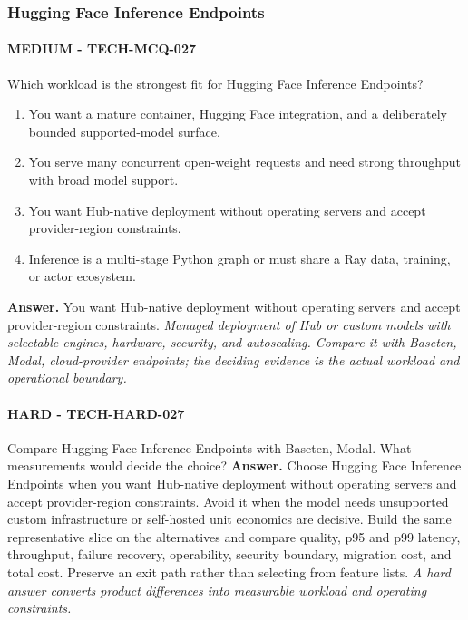 \subsubsection*{Hugging Face Inference Endpoints}
\paragraph{MEDIUM - TECH-MCQ-027} Which workload is the strongest fit for Hugging Face Inference Endpoints?
\begin{enumerate}[label=\Alph*.]
\item You want a mature container, Hugging Face integration, and a deliberately bounded supported-model surface.
\item You serve many concurrent open-weight requests and need strong throughput with broad model support.
\item You want Hub-native deployment without operating servers and accept provider-region constraints.
\item Inference is a multi-stage Python graph or must share a Ray data, training, or actor ecosystem.
\end{enumerate}
\textbf{Answer.} You want Hub-native deployment without operating servers and accept provider-region constraints.
\textit{Managed deployment of Hub or custom models with selectable engines, hardware, security, and autoscaling. Compare it with Baseten, Modal, cloud-provider endpoints; the deciding evidence is the actual workload and operational boundary.}
\paragraph{HARD - TECH-HARD-027} Compare Hugging Face Inference Endpoints with Baseten, Modal. What measurements would decide the choice?
\textbf{Answer.} Choose Hugging Face Inference Endpoints when you want Hub-native deployment without operating servers and accept provider-region constraints. Avoid it when the model needs unsupported custom infrastructure or self-hosted unit economics are decisive. Build the same representative slice on the alternatives and compare quality, p95 and p99 latency, throughput, failure recovery, operability, security boundary, migration cost, and total cost. Preserve an exit path rather than selecting from feature lists.
\textit{A hard answer converts product differences into measurable workload and operating constraints.}
